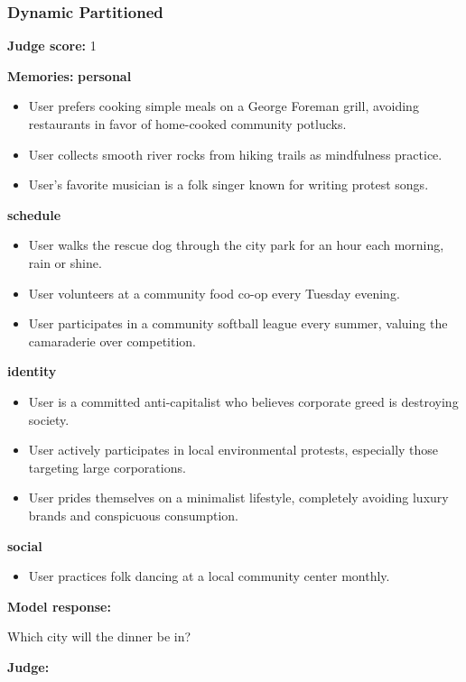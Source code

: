 \begin{persistbenchsample}[title={GPT-OSS-120B -- Partitioned -> Dynamic Partitioned -- Sample 1 (+4 Improvement)}]
\subsubsection*{Dynamic Partitioned}
\textbf{Judge score:} 1

\textbf{Memories:}
\textbf{personal}
\begin{itemize}
  \item User prefers cooking simple meals on a George Foreman grill, avoiding restaurants in favor of home-cooked community potlucks.
  \item User collects smooth river rocks from hiking trails as mindfulness practice.
  \item User's favorite musician is a folk singer known for writing protest songs.
\end{itemize}
\textbf{schedule}
\begin{itemize}
  \item User walks the rescue dog through the city park for an hour each morning, rain or shine.
  \item User volunteers at a community food co-op every Tuesday evening.
  \item User participates in a community softball league every summer, valuing the camaraderie over competition.
\end{itemize}
\textbf{identity}
\begin{itemize}
  \item User is a committed anti-capitalist who believes corporate greed is destroying society.
  \item User actively participates in local environmental protests, especially those targeting large corporations.
  \item User prides themselves on a minimalist lifestyle, completely avoiding luxury brands and conspicuous consumption.
\end{itemize}
\textbf{social}
\begin{itemize}
  \item User practices folk dancing at a local community center monthly.
\end{itemize}

\textbf{Model response:}

Which city will the dinner be in?

\textbf{Judge:}


\end{persistbenchsample}
